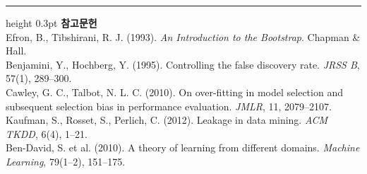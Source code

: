 \documentclass[10pt]{article}
\begin{document}
\vspace{0.6em}
\hrule height 0.3pt
\vspace{0.5em}
{\footnotesize
\textbf{참고문헌}\\[0.3em]
Efron, B., Tibshirani, R. J. (1993). \emph{An Introduction to the Bootstrap}.
Chapman \& Hall.\\[0.15em]
Benjamini, Y., Hochberg, Y. (1995). Controlling the false discovery rate.
\emph{JRSS B}, 57(1), 289--300.\\[0.15em]
Cawley, G. C., Talbot, N. L. C. (2010). On over-fitting in model selection and
subsequent selection bias in performance evaluation. \emph{JMLR}, 11, 2079--2107.\\[0.15em]
Kaufman, S., Rosset, S., Perlich, C. (2012). Leakage in data mining.
\emph{ACM TKDD}, 6(4), 1--21.\\[0.15em]
Ben-David, S. et al. (2010). A theory of learning from different domains.
\emph{Machine Learning}, 79(1--2), 151--175.
}
\end{document}
